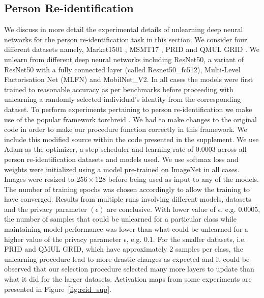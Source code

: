 \subsection{Person Re-identification}
We discuss in more detail the experimental details of unlearning deep neural networks for the person re-identification task in this section. We consider four different datasets namely, Market1501 \citep{zheng2015scalable}, MSMT17 \citep{wei2018person}, PRID \citep{hirzer11} and  QMUL GRID \citep{loy2009multi}. We unlearn from different deep neural networks including ResNet50, a variant of ResNet50 with a fully connected layer (called Resnet50\_fc512), Multi-Level Factorisation Net (MLFN) and MobilNet\_V2. In all cases the models were first trained to reasonable accuracy as per benchmarks before proceeding with unlearning a randomly selected individual's identity from the corresponding dataset. To perform experiments pertaining to person re-identification we make use of the popular framework torchreid \citep{zhou2019omni}. We had to make changes to the original code in order to make our procedure function correctly in this framework. We include this modified source within the code presented in the supplement. We use Adam as the optimizer, a step scheduler and learning rate of $0.0003$ across all person re-identification datasets and models used. We use softmax loss and weights were initialized using a model pre-trained on ImageNet in all cases. Images were resized to $256 \times 128$ before being used as input to any of the models. The number of training epochs was chosen accordingly to allow the training to have converged. Results from multiple runs involving different models, datasets and the privacy parameter $(\epsilon)$ are conclusive. With lower value of $\epsilon$, e.g. $0.0005$, the number of samples that could be unlearned for a particular class while maintaining model performance was lower than what could be unlearned for a higher value of the privacy parameter $\epsilon$, e.g. $0.1$. For the smaller datasets, i.e. PRID and QMUL GRID, which have approximately 2 samples per class, the unlearning procedure lead to more drastic changes as expected and it could be observed that our selection procedure selected many more layers to update than what it did for the larger datasets. Activation maps from some experiments are presented in Figure~\ref{fig:reid_sup}.

